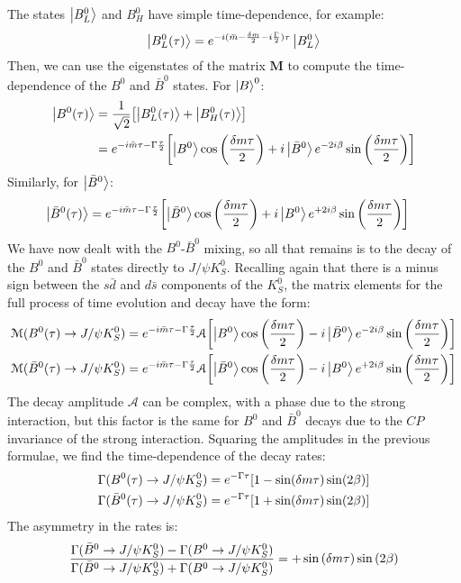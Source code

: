 \documentclass[../../main/main.tex]{subfiles}
\begin{document}
The states \( \ket{B^0_L} \) and \( B^0_H \) have simple time-dependence, for example:
\begin{equation}
	\ket{B^0_L(\tau)}
	=
	e^{-i(\bar{m} - \frac{\delta m}{2} - i \frac{\Gamma}{2})\tau} \ket{B^0_L}
	\label{eq:}
\end{equation}
Then, we can use the eigenstates of the matrix \( \mathbf{M} \) to compute the time-dependence of the \( B^0 \) and \( \bar{B}^0 \) states. For \( \ket{B}^0  \):
\begin{align}
	\ket{B^0(\tau)}
		&=
			\frac{1}{\sqrt{2}} \qty[\ket{B^0_L(\tau)} + \ket{B^0_H(\tau)}]	\nonumber	\\
		&=
			e^{-i\bar{m}\tau - \Gamma\frac{\tau}{2}}
			\qty[\ket{B^0} \cos\qty(\frac{\delta m \tau}{2}) + i \ket{\bar{B}^0} e^{-2i\beta}\sin\qty(\frac{\delta m \tau}{2})]
\end{align}
Similarly, for \( \ket{\bar{B}^0} \):
\begin{align}
	\ket{\bar{B}^0(\tau)}
		&=
			e^{-i\bar{m}\tau - \Gamma\frac{\tau}{2}}
			\qty[\ket{\bar{B}^0} \cos\qty(\frac{\delta m \tau}{2}) + i \ket{B^0} e^{+2i\beta}\sin\qty(\frac{\delta m \tau}{2})]
\end{align}
We have now dealt with the \( B^0 \)-\( \bar{B}^0 \) mixing, so all that remains is to the decay of the \( B^0 \) and \( \bar{B}^0 \) states directly to \( J/\psi K^0_S \). Recalling again that there is a minus sign between the \( s\bar{d} \) and \( d\bar{s} \) components of the \( K^0_S \), the matrix elements for the full process of time evolution and decay have the form:
\begin{align}
	\mathcal{M}(B^0(\tau) \rightarrow J/\psi K^0_S)
		&=
		e^{-i\bar{m}\tau - \Gamma\frac{\tau}{2}} \mathcal{A}
		\qty[\ket{B^0} \cos\qty(\frac{\delta m \tau}{2}) - i \ket{\bar{B}^0} e^{-2i\beta}\sin\qty(\frac{\delta m \tau}{2})]	\\
	\mathcal{M}(\bar{B}^0(\tau) \rightarrow J/\psi K^0_S)
		&=
		e^{-i\bar{m}\tau - \Gamma\frac{\tau}{2}} \mathcal{A}
		\qty[\ket{\bar{B}^0} \cos\qty(\frac{\delta m \tau}{2}) - i \ket{B^0} e^{+2i\beta}\sin\qty(\frac{\delta m \tau}{2})]
\end{align}
The decay amplitude \( \mathcal{A} \) can be complex, with a phase due to the strong interaction, but this factor is the same for \( B^0 \) and \( \bar{B}^0 \) decays due to the \( CP \) invariance of the strong interaction. Squaring the amplitudes in the previous formulae, we find the time-dependence of the decay rates:
\begin{align}
	\Gamma(B^0(\tau) \rightarrow J/\psi K^0_S)
		&=
		e^{-\Gamma \tau}
		\qty[1 - \sin(\delta m \tau) \sin(2\beta)]	\\
	\Gamma(\bar{B}^0(\tau) \rightarrow J/\psi K^0_S)
		&=
		e^{-\Gamma \tau}
		\qty[1 + \sin(\delta m \tau) \sin(2\beta)]
\end{align}
The asymmetry in the rates is:
\begin{equation}
	\frac{\Gamma(\bar{B}^0 \rightarrow J/\psi K^0_S) - \Gamma(B^0 \rightarrow J/\psi K^0_S)}{\Gamma(\bar{B}^0 \rightarrow J/\psi K^0_S) + \Gamma(B^0 \rightarrow J/\psi K^0_S)}
	=
	+ \sin \qty(\delta m \tau) \sin \qty(2 \beta)
	\label{eq:}
\end{equation}
\end{document}
